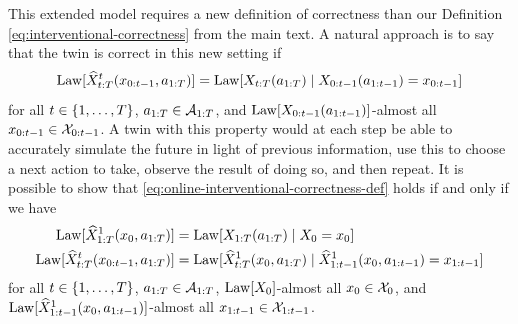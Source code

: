This extended model requires a new definition of correctness than our Definition \ref{eq:interventional-correctness} from the main text.
A natural approach is to say that the twin is correct in this new setting if
\begin{equation}
    \mathrm{Law}[\widehat{X}_{t:T}^t(x_{0:t-1}, a_{1:T})]
        = \mathrm{Law}[X_{t:T}(a_{1:T}) \mid X_{0:t-1}(a_{1:t-1}) = x_{0:t-1}] \label{eq:online-interventional-correctness-def}
\end{equation}
for all $t \in \{1, \ldots, T\}$, $a_{1:T} \in \mathcal{A}_{1:T}$, and $\mathrm{Law}[X_{0:t-1}(a_{1:t-1})]$-almost all $x_{0:t-1} \in \mathcal{X}_{0:t-1}$.
A twin with this property would at each step be able to accurately simulate the future in light of previous information, use this to choose a next action to take, observe the result of doing so, and then repeat.
It is possible to show that \eqref{eq:online-interventional-correctness-def} holds if and only if we have
\begin{align*}
    \mathrm{Law}[\widehat{X}^1_{1:T}(x_0, a_{1:T})] &= \mathrm{Law}[X_{1:T}(a_{1:T}) \mid X_{0}=x_0] \\
    \mathrm{Law}[\widehat{X}^t_{t:T}(x_{0:t-1}, a_{1:T})]
        &= \mathrm{Law}[\widehat{X}^1_{t:T}(x_0, a_{1:T}) \mid \widehat{X}_{1:t-1}^1(x_0, a_{1:t-1}) = x_{1:t-1}]
\end{align*}
for all $t \in \{1, \ldots, T\}$, $a_{1:T} \in \mathcal{A}_{1:T}$, $\mathrm{Law}[X_0]$-almost all $x_0 \in \mathcal{X}_0$, and $\mathrm{Law}[\widehat{X}_{1:t-1}^1(x_0, a_{1:t-1})]$-almost all $x_{1:t-1} \in \mathcal{X}_{1:t-1}$.
